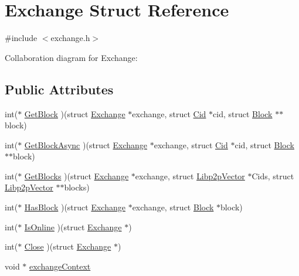 \hypertarget{struct_exchange}{}\section{Exchange Struct Reference}
\label{struct_exchange}


{\ttfamily \#include $<$exchange.\+h$>$}



Collaboration diagram for Exchange\+:
\subsection*{Public Attributes}
\begin{DoxyCompactItemize}
\item 
int($\ast$ \mbox{\hyperlink{struct_exchange_af19779992ce0133da548d7ed9e5c5a56}{Get\+Block}} )(struct \mbox{\hyperlink{struct_exchange}{Exchange}} $\ast$exchange, struct \mbox{\hyperlink{struct_cid}{Cid}} $\ast$cid, struct \mbox{\hyperlink{struct_block}{Block}} $\ast$$\ast$block)
\item 
int($\ast$ \mbox{\hyperlink{struct_exchange_afbcf1a1a4aa0d3044ee3e4f50b397340}{Get\+Block\+Async}} )(struct \mbox{\hyperlink{struct_exchange}{Exchange}} $\ast$exchange, struct \mbox{\hyperlink{struct_cid}{Cid}} $\ast$cid, struct \mbox{\hyperlink{struct_block}{Block}} $\ast$$\ast$block)
\item 
int($\ast$ \mbox{\hyperlink{struct_exchange_a64f3a75ea2dc9770e084ffd6dd181df8}{Get\+Blocks}} )(struct \mbox{\hyperlink{struct_exchange}{Exchange}} $\ast$exchange, struct \mbox{\hyperlink{struct_libp2p_vector}{Libp2p\+Vector}} $\ast$Cids, struct \mbox{\hyperlink{struct_libp2p_vector}{Libp2p\+Vector}} $\ast$$\ast$blocks)
\item 
int($\ast$ \mbox{\hyperlink{struct_exchange_a4b8d64028bd091688fbb902ee1f970ca}{Has\+Block}} )(struct \mbox{\hyperlink{struct_exchange}{Exchange}} $\ast$exchange, struct \mbox{\hyperlink{struct_block}{Block}} $\ast$block)
\item 
int($\ast$ \mbox{\hyperlink{struct_exchange_aa11261b2f863752b0ef803bcfe2fb5fa}{Is\+Online}} )(struct \mbox{\hyperlink{struct_exchange}{Exchange}} $\ast$)
\item 
int($\ast$ \mbox{\hyperlink{struct_exchange_afe4482140e4e4b35bfe3a7caa905b7c0}{Close}} )(struct \mbox{\hyperlink{struct_exchange}{Exchange}} $\ast$)
\item 
void $\ast$ \mbox{\hyperlink{struct_exchange_a1215da5586811e5d8593f8e5a8361954}{exchange\+Context}}
\item 
$$
\end{DoxyCompactItemize}
